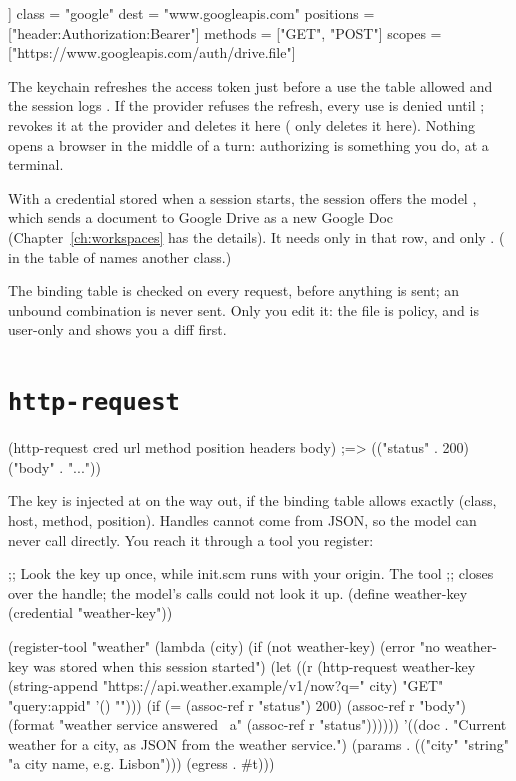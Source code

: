 \begin{toml}
[[bind]]
class = "google"
dest = "www.googleapis.com"
positions = ["header:Authorization:Bearer"]
methods = ["GET", "POST"]
scopes = ["https://www.googleapis.com/auth/drive.file"]
\end{toml}

The keychain refreshes the access token just before a use the table
allowed and the session logs . If the provider refuses
the refresh, every use is denied until ;  revokes it at the provider and
deletes it here ( only deletes it here). Nothing opens a
browser in the middle of a turn: authorizing is something you do, at a
terminal.

With a  credential stored when a session starts, the session
offers the model , which sends a document to
Google Drive as a new Google Doc (Chapter~\ref{ch:workspaces} has the
details). It needs only  in that row, and only
. ( in the \code{[docs]} table of
 names another class.)

The binding table is checked on every
request, before anything is sent; an unbound combination is never sent.
Only you edit it: the file is policy, and  is user-only
and shows you a diff first.

\section{\texttt{http-request}}

\begin{scm}
(http-request cred url method position headers body)
;=> (("status" . 200) ("body" . "..."))
\end{scm}

The key is injected at  on the way out, if the binding table
allows exactly (class, host, method, position). Handles cannot come from
JSON, so the model can never call  directly. You reach
it through a tool you register:

\begin{scm}
;; Look the key up once, while init.scm runs with your origin. The tool
;; closes over the handle; the model's calls could not look it up.
(define weather-key (credential "weather-key"))

(register-tool "weather"
  (lambda (city)
    (if (not weather-key)
        (error "no weather-key was stored when this session started")
        (let ((r (http-request weather-key
                               (string-append "https://api.weather.example/v1/now?q=" city)
                               "GET" "query:appid" '() "")))
          (if (= (assoc-ref r "status") 200)
              (assoc-ref r "body")
              (format "weather service answered ~a" (assoc-ref r "status"))))))
  '((doc . "Current weather for a city, as JSON from the weather service.")
    (params . (("city" "string" "a city name, e.g. Lisbon")))
    (egress . #t)))
\end{scm}


